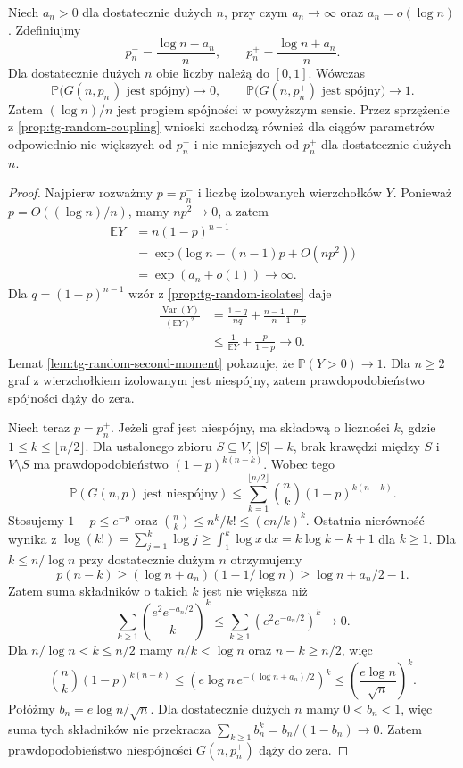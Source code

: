 \begin{twierdzenie}
\label{thm:tg-random-connectivity}
Niech $a_n>0$ dla dostatecznie
dużych $n$, przy czym
$a_n\to\infty$ oraz
$a_n=o(\log n)$.
Zdefiniujmy
\[
p_n^-=\frac{\log n-a_n}{n},
\qquad
p_n^+=\frac{\log n+a_n}{n}.
\]
Dla dostatecznie dużych $n$
obie liczby należą do $[0,1]$.
Wówczas
\[
\mathbb P\bigl(G(n,p_n^-)
\text{ jest spójny}\bigr)\to0,
\qquad
\mathbb P\bigl(G(n,p_n^+)
\text{ jest spójny}\bigr)\to1.
\]
Zatem $(\log n)/n$ jest progiem spójności
w powyższym sensie. Przez sprzężenie z
\ref{prop:tg-random-coupling} wnioski zachodzą
również dla ciągów parametrów odpowiednio
nie większych od $p_n^-$ i nie mniejszych od $p_n^+$
dla dostatecznie dużych $n$.
\end{twierdzenie}
\begin{proof}
Najpierw rozważmy
$p=p_n^-$ i liczbę
izolowanych wierzchołków $Y$.
Ponieważ $p=O((\log n)/n)$,
mamy $np^2\to0$, a zatem
\[
\begin{aligned}
\mathbb EY
&=n(1-p)^{n-1}\\
&=\exp\bigl(\log n-(n-1)p+O(np^2)\bigr)\\
&=\exp(a_n+o(1))\longrightarrow\infty.
\end{aligned}
\]
Dla $q=(1-p)^{n-1}$
wzór z
\ref{prop:tg-random-isolates}
daje
\[
\begin{aligned}
\frac{\operatorname{Var}(Y)}{(\mathbb EY)^2}
&=\frac{1-q}{nq}
+\frac{n-1}{n}\frac{p}{1-p}\\
&\leq\frac1{\mathbb EY}
+\frac{p}{1-p}\longrightarrow0.
\end{aligned}
\]
Lemat \ref{lem:tg-random-second-moment}
pokazuje, że
$\mathbb P(Y>0)\to1$.
Dla $n\geq2$ graf
z wierzchołkiem izolowanym
jest niespójny, zatem
prawdopodobieństwo
spójności dąży do zera.

Niech teraz $p=p_n^+$.
Jeżeli graf jest niespójny,
ma składową o liczności
$k$, gdzie
$1\leq k\leq\lfloor n/2\rfloor$.
Dla ustalonego zbioru
$S\subseteq V$, $|S|=k$,
brak krawędzi między
$S$ i $V\setminus S$
ma prawdopodobieństwo
$(1-p)^{k(n-k)}$.
Wobec tego
\[
\mathbb P(G(n,p)\text{ jest niespójny})
\leq\sum_{k=1}^{\lfloor n/2\rfloor}
\binom nk(1-p)^{k(n-k)}.
\]
Stosujemy $1-p\leq e^{-p}$ oraz
$\binom nk\leq n^k/k!\leq(en/k)^k$.
Ostatnia nierówność wynika z
$\log(k!)=\sum_{j=1}^k\log j\geq\int_1^k\log x\,\mathrm dx
=k\log k-k+1$ dla $k\geq1$.
Dla $k\leq n/\log n$
przy dostatecznie dużym $n$
otrzymujemy
\[
p(n-k)\geq
(\log n+a_n)(1-1/\log n)
\geq\log n+a_n/2-1.
\]
Zatem suma składników
o takich $k$ jest
nie większa niż
\[
\sum_{k\geq1}
\left(\frac{e^2e^{-a_n/2}}{k}\right)^k
\leq\sum_{k\geq1}
\left(e^2e^{-a_n/2}\right)^k
\longrightarrow0.
\]
Dla $n/\log n<k\leq n/2$
mamy $n/k<\log n$
oraz $n-k\geq n/2$, więc
\[
\binom nk(1-p)^{k(n-k)}
\leq\left(
e\log n\,e^{-(\log n+a_n)/2}
\right)^k
\leq\left(\frac{e\log n}{\sqrt n}\right)^k.
\]
Połóżmy $b_n=e\log n/\sqrt n$. Dla dostatecznie
dużych $n$ mamy $0<b_n<1$, więc suma tych składników
nie przekracza $\sum_{k\geq1}b_n^k=b_n/(1-b_n)\to0$.
Zatem prawdopodobieństwo
niespójności $G(n,p_n^+)$
dąży do zera.
\end{proof}

